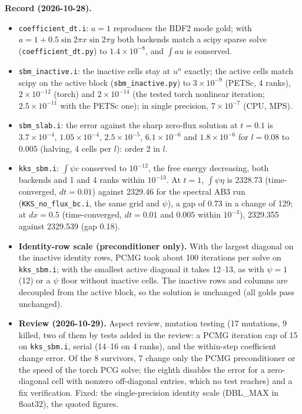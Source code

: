 \documentclass[11pt]{article}
\begin{document}
\textbf{Record (2026-10-28).}
\begin{itemize}[leftmargin=*]
\item \texttt{coefficient\_dt.i}: $a = 1$ reproduces the BDF2 mode gold; with
$a = 1 + 0.5\sin 2\pi x\sin 2\pi y$ both backends match a scipy sparse solve
(\texttt{coefficient\_dt.py}) to $1.4\times10^{-8}$, and $\int a u$ is conserved.
\item \texttt{sbm\_inactive.i}: the inactive cells stay at $u^n$ exactly; the active cells
match scipy on the active block (\texttt{sbm\_inactive.py}) to $3\times10^{-9}$ (PETSc, 4 ranks),
$2\times10^{-12}$ (torch) and $2\times10^{-14}$ (the tested torch nonlinear iteration;
$2.5\times10^{-11}$ with the PETSc one); in single precision, $7\times10^{-7}$ (CPU, MPS).
\item \texttt{sbm\_slab.i}: the error against the sharp zero-flux solution at $t = 0.1$ is
$3.7\times10^{-4}$, $1.05\times10^{-4}$, $2.5\times10^{-5}$, $6.1\times10^{-6}$ and
$1.8\times10^{-6}$ for $l = 0.08$ to $0.005$ (halving, 4 cells per $l$): order 2 in $l$.
\item \texttt{kks\_sbm.i}: $\int\psi c$ conserved to $10^{-12}$, the free energy decreasing,
both backends and 1 and 4 ranks within $10^{-13}$. At $t = 1$, $\int\psi\eta$ is 2328.73
(time-converged, $dt = 0.01$) against 2329.46 for the spectral AB3 run
(\texttt{KKS\_no\_flux\_bc.i}, the same grid and $\psi$), a gap of 0.73 in a change of 129; at
$dx = 0.5$ (time-converged, $dt = 0.01$ and $0.005$ within $10^{-3}$), 2329.355 against 2329.539
(gap 0.18).
\item \textbf{Identity-row scale (preconditioner only).} With the largest diagonal on the
inactive identity rows, PCMG took about 100 iterations per solve on \texttt{kks\_sbm.i}; with the
smallest active diagonal it takes 12--13, as with $\psi = 1$ (12) or a $\psi$ floor without
inactive cells. The inactive rows and columns are decoupled from the active block, so the
solution is unchanged (all golds pass unchanged).
\item \textbf{Review (2026-10-29).} Aspect review, mutation testing (17 mutations, 9 killed, two of them by
tests added in the review: a PCMG iteration cap of 15 on \texttt{kks\_sbm.i}, serial (14--16 on 4
ranks), and the within-step coefficient change error. Of the 8 survivors, 7 change only the
PCMG preconditioner or the speed of the torch PCG solve; the eighth disables the error for a
zero-diagonal cell with nonzero off-diagonal entries, which no test reaches)
and a fix verification. Fixed: the single-precision identity scale (DBL\_MAX in float32), the
quoted figures.
\end{itemize}
\end{document}
